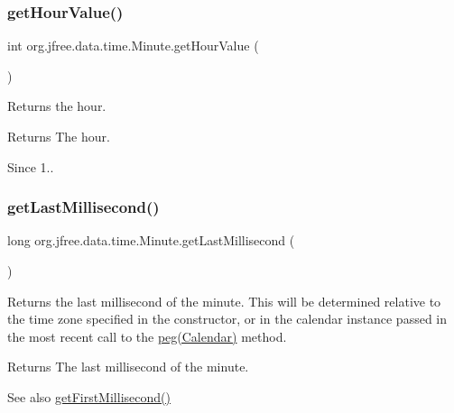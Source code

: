 \subsubsection{\texorpdfstring{get\+Hour\+Value()}{getHourValue()}}
{\footnotesize\ttfamily int org.\+jfree.\+data.\+time.\+Minute.\+get\+Hour\+Value (\begin{DoxyParamCaption}{ }\end{DoxyParamCaption})}

Returns the hour.

\begin{DoxyReturn}{Returns}
The hour.
\end{DoxyReturn}
\begin{DoxySince}{Since}
1.. 
\end{DoxySince}
\mbox{\label{classorg_1_1jfree_1_1data_1_1time_1_1_minute_aa90d6502bb7d61c7fffdf9e43f2abdae}} 
\subsubsection{\texorpdfstring{get\+Last\+Millisecond()}{getLastMillisecond()}\hspace{0.1cm}{\footnotesize\ttfamily [1/2]}}
{\footnotesize\ttfamily long org.\+jfree.\+data.\+time.\+Minute.\+get\+Last\+Millisecond (\begin{DoxyParamCaption}{ }\end{DoxyParamCaption})}

Returns the last millisecond of the minute. This will be determined relative to the time zone specified in the constructor, or in the calendar instance passed in the most recent call to the \mbox{\hyperlink{classorg_1_1jfree_1_1data_1_1time_1_1_minute_ae7da5fb521ede7ac4a60122fb99266d3}{peg(\+Calendar)}} method.

\begin{DoxyReturn}{Returns}
The last millisecond of the minute.
\end{DoxyReturn}
\begin{DoxySeeAlso}{See also}
\mbox{\hyperlink{classorg_1_1jfree_1_1data_1_1time_1_1_minute_a7f32248c4b7738436aa841d9abcb9114}{get\+First\+Millisecond()}} 
\end{DoxySeeAlso}
\mbox{\label{classorg_1_1jfree_1_1data_1_1time_1_1_minute_a8c46d7794fe371defd6eae869807a7b8}} 
